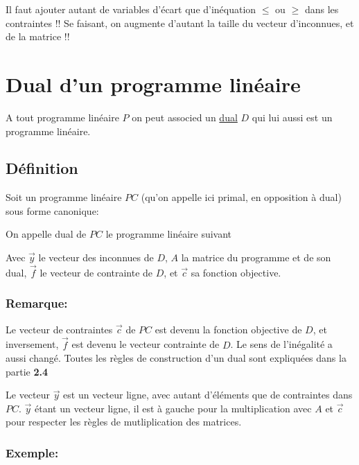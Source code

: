 \documentclass[a4paper, 11pt]{article}
\begin{document}
Il faut ajouter autant de variables d'écart que d'inéquation $\le$ ou $\ge$ dans les contraintes !!
Se faisant, on augmente d'autant la taille du vecteur d'inconnues, et de la matrice !!

\newpage
\section{Dual d'un programme linéaire}

A tout programme linéaire $P$ on peut associed un \underline{dual} $D$ qui lui aussi est un programme linéaire.

\subsection{Définition}

Soit un programme linéaire $PC$ (qu'on appelle ici primal, en opposition à dual) sous forme canonique:


On appelle dual de $PC$ le programme linéaire suivant


Avec $\vec{y}$ le vecteur des inconnues de $D$, $A$ la matrice du programme et de son dual, $\vec{f}$ le vecteur de contrainte de $D$, et $\vec{c}$ sa fonction objective.

\subsubsection{Remarque:}

Le vecteur de contraintes $\vec{c}$ de $PC$ est devenu la fonction objective de $D$, et inversement, $\vec{f}$ est devenu le vecteur contrainte de $D$.
Le sens de l'inégalité a aussi changé. Toutes les règles de construction d'un dual sont expliquées dans la partie \textbf{2.4}

Le vecteur $\vec{y}$ est un vecteur ligne, avec autant d'éléments que de contraintes dans $PC$.
$\vec{y}$ étant un vecteur ligne, il est à gauche pour la multiplication avec $A$ et $\vec{c}$ pour respecter les règles de mutliplication des matrices.

\subsubsection{Exemple:}
\end{document}
